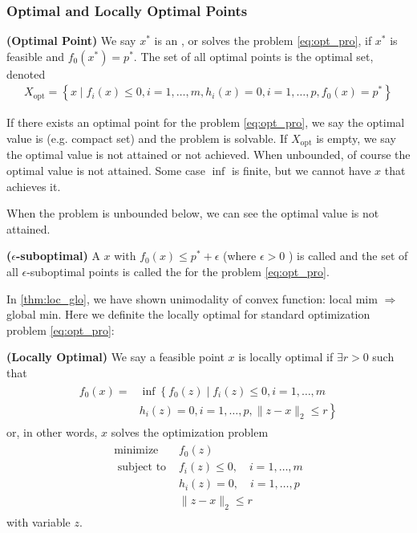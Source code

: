 \documentclass{article}
\newcommand{\bfs}[1]{\textbf{({#1}) }}
\begin{document}
\subsubsection{Optimal and Locally Optimal Points}
\begin{defa}\bfs{Optimal Point}
We say $x^* $ is an , or solves the problem \cref{eq:opt_pro}, if $x^* $ is feasible and $f_{0}\left(x^* \right)=p^*  .$ The set of all optimal points is the optimal set, denoted
\begin{align*}
X_{\mathrm{opt}}=\left\{x \mid f_{i}(x) \leq 0, i=1, \ldots, m, h_{i}(x)=0, i=1, \ldots, p, f_{0}(x)=p^* \right\}
\end{align*}
\end{defa}
\begin{rema}
If there exists an optimal point for the problem \cref{eq:opt_pro}, we say the optimal value is  (e.g. compact set) and the problem is solvable. If $X_{\mathrm{opt}}$ is empty, we say the optimal value is not attained or not achieved. When unbounded, of course the optimal value is not attained. Some case $\inf$ is finite, but we cannot have $x$ that achieves it.

When the problem is unbounded below, we can see the optimal value is not attained.
\end{rema}
\begin{defa}\bfs{$\epsilon$-suboptimal}\label{def:hfedfeheq}
 A  $x$ with $f_{0}(x) \leq p^* +\epsilon$ (where $\epsilon>0$ ) is called  and the set of all $\epsilon$-suboptimal points is called the  for the problem \cref{eq:opt_pro}.
\end{defa}
In \cref{thm:loc_glo}, we have shown unimodality of convex function: local mim $\Rightarrow$ global min. Here we definite the locally optimal for standard optimization problem \cref{eq:opt_pro}:
\begin{defa}\bfs{Locally Optimal}
We say a feasible point $x$ is locally optimal if $\exists r>0$ such that
\begin{align*}
\begin{aligned}
f_{0}(x)=& \inf \left\{f_{0}(z) \mid f_{i}(z) \leq 0, i=1, \ldots, m\right.\\
&\left.h_{i}(z)=0, i=1, \ldots, p,\|z-x\|_{2} \leq r\right\}
\end{aligned}
\end{align*}
or, in other words, $x$ solves the optimization problem
\begin{align*}
\begin{array}{ll}
\operatorname{minimize} & f_{0}(z) \\
\text { subject to } & f_{i}(z) \leq 0, \quad i=1, \ldots, m \\
& h_{i}(z)=0, \quad i=1, \ldots, p \\
& \|z-x\|_{2} \leq r
\end{array}
\end{align*}
with variable $z$. 
\end{defa}
\end{document}

